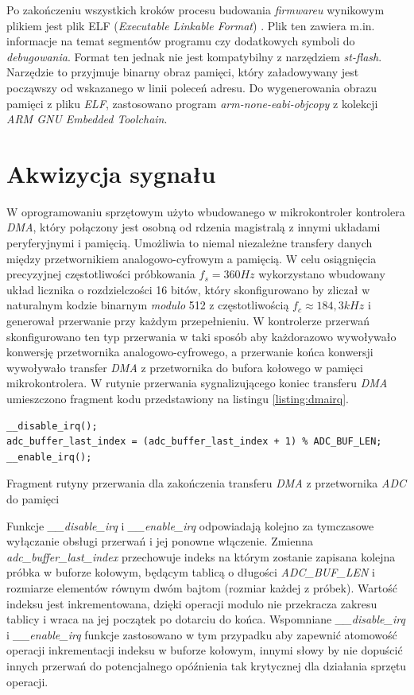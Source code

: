 Po zakończeniu wszystkich kroków procesu budowania \textit{firmwareu} wynikowym plikiem
jest plik ELF (\textit{Executable Linkable Format}) \cite{elfARM}. 
Plik ten zawiera m.in. informacje na temat segmentów programu czy dodatkowych symboli 
do \textit{debugowania}. Format ten jednak nie jest kompatybilny z narzędziem \textit{st-flash}.
Narzędzie to przyjmuje binarny obraz pamięci, który załadowywany jest począwszy od wskazanego
w linii poleceń adresu. Do wygenerowania obrazu pamięci z pliku \textit{ELF}, zastosowano program 
\textit{arm-none-eabi-objcopy} z kolekcji \textit{ARM GNU Embedded Toolchain}.

\section{Akwizycja sygnału}

W oprogramowaniu sprzętowym użyto wbudowanego w mikrokontroler kontrolera \textit{DMA}, który połączony jest
osobną od rdzenia magistralą z innymi układami peryferyjnymi i pamięcią. Umożliwia to niemal niezależne
transfery danych między przetwornikiem analogowo-cyfrowym a pamięcią.
W celu osiągnięcia precyzyjnej częstotliwości próbkowania $f_s = 360 Hz$ wykorzystano wbudowany układ licznika
o rozdzielczości 16 bitów, który skonfigurowano by zliczał w naturalnym kodzie binarnym \textit{modulo} 512 z częstotliwością 
$f_c \approx 184,3 kHz$ i generował przerwanie przy każdym przepełnieniu. W kontrolerze przerwań skonfigurowano ten 
typ przerwania w taki sposób aby każdorazowo wywoływało konwersję przetwornika analogowo-cyfrowego, a przerwanie
końca konwersji wywoływało transfer \textit{DMA} z przetwornika do bufora kołowego w pamięci mikrokontrolera.
W rutynie przerwania sygnalizującego koniec transferu \textit{DMA} umieszczono fragment kodu przedstawiony na listingu
\ref{listing:dmairq}.

\begin{listing}
\begin{verbatim}
__disable_irq();
adc_buffer_last_index = (adc_buffer_last_index + 1) % ADC_BUF_LEN;
__enable_irq();
\end{verbatim} 
\caption{Fragment rutyny przerwania dla zakończenia transferu \textit{DMA} z przetwornika \textit{ADC} do pamięci}
\label{listing:dmairq}
\end{listing}

Funkcje \textit{\_\_disable\_irq} i \textit{\_\_enable\_irq} odpowiadają kolejno za tymczasowe wyłączanie obsługi przerwań 
i jej ponowne włączenie.
Zmienna \textit{adc\_buffer\_last\_index} przechowuje indeks na którym zostanie zapisana kolejna próbka w buforze kołowym, będącym
tablicą o długości \textit{ADC\_BUF\_LEN} i rozmiarze elementów równym dwóm bajtom (rozmiar każdej z próbek). Wartość
indeksu jest inkrementowana, dzięki operacji modulo nie przekracza zakresu tablicy i wraca na jej początek po dotarciu do końca.
Wspomniane \textit{\_\_disable\_irq} i \textit{\_\_enable\_irq} funkcje zastosowano w tym przypadku aby zapewnić 
atomowość operacji inkrementacji indeksu w buforze kołowym, innymi słowy by nie dopuścić innych przerwań do 
potencjalnego opóźnienia tak krytycznej dla działania sprzętu operacji.


